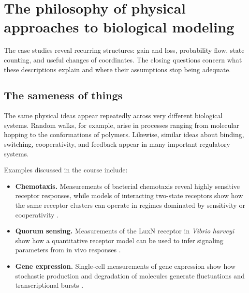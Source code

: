 \clearpage
\section{The philosophy of physical approaches to biological modeling}
\label{sec:philosophy}
The case studies reveal recurring structures: gain and loss, probability flow, state counting, and useful changes of coordinates.
The closing questions concern what these descriptions explain and where their assumptions stop being adequate.
\subsection{The sameness of things}
\label{sec:sameness}



The same physical ideas appear repeatedly across very different biological systems.
Random walks, for example, arise in processes ranging from molecular hopping to the conformations of polymers.
Likewise, similar ideas about binding, switching, cooperativity, and feedback appear in many important regulatory systems.

Examples discussed in the course include:

\begin{itemize}
    \item \textbf{Chemotaxis.}
    Measurements of bacterial chemotaxis reveal highly sensitive receptor responses, while models of interacting two-state receptors show how the same receptor clusters can operate in regimes dominated by sensitivity or cooperativity \cite{sourjik2002receptor,keymer2006chemosensing}.

    \item \textbf{Quorum sensing.}
    Measurements of the LuxN receptor in \textit{Vibrio harveyi} show how a quantitative receptor model can be used to infer signaling parameters from in vivo responses \cite{swem2008deducing}.

    \item \textbf{Gene expression.}
    Single-cell measurements of gene expression show how stochastic production and degradation of molecules generate fluctuations and transcriptional bursts \cite{golding2005real}.
\end{itemize}



